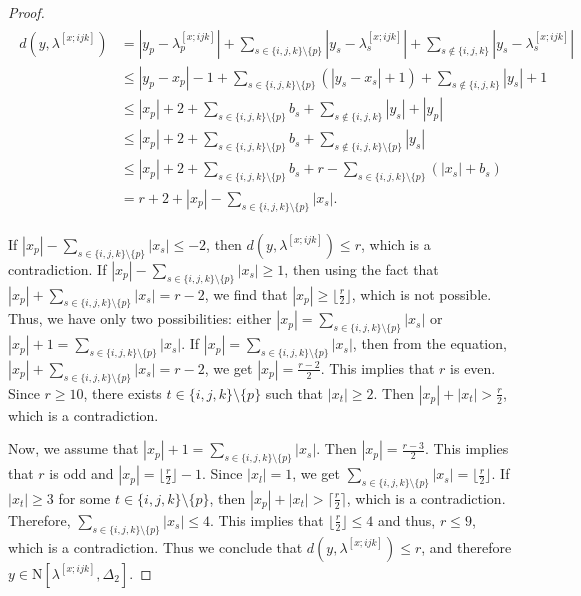\documentclass[10pt,a4paper]{amsart}
\def\n{{\mathrm{N}}}
\newcommand{\D}{\Delta}
\newcommand{\cil}{\lceil\frac{r}{2}\rceil}
\newcommand{\f}{\lfloor\frac{r}{2}\rfloor}
\begin{document}
\begin{proof}
	\begin{align*}
    \begin{split}
		d(y,\lambda^{[x;ijk]})&=|y_p-\lambda^{[x;ijk]}_p|+ \sum_{s \in \{i, j, k\}\setminus\{p\}}|y_s-\lambda^{[x;ijk]}_s|+\sum_{s\notin\{i,j,k\}}|y_s-\lambda^{[x;ijk]}_s| \\
		&\leq  |y_p-x_p|-1+ \sum_{s \in \{i, j, k\}\setminus\{p\}}(|y_s-x_s|+1 )+\sum_{s\notin\{i,j,k\}}|y_s| +1 \\
		&\leq  |x_p|+2+ \sum_{s \in \{i, j, k\}\setminus \{p\}} b_s+\sum_{s\notin\{i,j,k\}}|y_s| +|y_p| \\
		&\leq|x_p|+2+\sum_{s \in \{i, j, k\}\setminus \{p\}} b_s+\sum_{s\notin\{i, j,k\} \setminus \{p\}}|y_s| \\
		&\leq |x_p|+2 + \sum_{s \in \{i, j, k\}\setminus \{p\}} b_s+r- \sum_{s \in \{i, j, k\}\setminus \{p\}} (|x_s|+b_s) \\
		&= r+2+|x_p|-\sum_{s \in \{i, j, k\}\setminus \{p\}} |x_s|.
         	\end{split}
	\end{align*}
	
	If $|x_p|-\sum_{s \in \{i, j, k\}\setminus \{p\}} |x_s|\leq -2$, then $d(y,\lambda^{[x;ijk]})\leq r$, which is a contradiction. If $|x_p|-\sum_{s \in \{i, j, k\}\setminus \{p\}} |x_s|\geq 1$, then using the fact that $|x_p|+\sum_{s \in \{i, j, k\}\setminus \{p\}} |x_s|=r-2$, we find that $|x_p|\geq \f$, which is not possible. Thus, we have only two possibilities: either $|x_p|=\sum_{s \in \{i, j, k\}\setminus \{p\}} |x_s|$ or $|x_p|+1=\sum_{s \in \{i, j, k\}\setminus \{p\}} |x_s|$. If $|x_p|=\sum_{s \in \{i, j, k\}\setminus \{p\}} |x_s|$, then from the equation, $|x_p|+\sum_{s \in \{i, j, k\}\setminus \{p\}} |x_s|=r-2$, we get $|x_p|=\frac{r-2}{2}$. This implies that $r$ is even. Since $r\geq 10$, there exists $t\in \{i,j,k\}\setminus \{p\}$ such that $|x_t|\geq 2$. Then $|x_p|+|x_t|>\frac{r}{2}$, which is a contradiction. 
	
	Now, we assume that $|x_p|+1=\sum_{s \in \{i, j, k\}\setminus \{p\}} |x_s|$. Then $|x_p|=\frac{r-3}{2}$. This implies that $r$ is odd and $|x_p|=\f-1$. Since $|x_l|=1$, we get $\sum_{s \in \{i, j, k\}\setminus \{p\}} |x_s|=\f$. If $|x_t|\geq 3$ for some $t\in \{i, j, k\}\setminus \{p\}$, then $|x_p|+|x_t|>\cil$, which is a contradiction. Therefore,  $\sum_{s \in \{i, j, k\}\setminus \{p\}} |x_s|\leq 4$. This implies that $\f\leq 4$ and thus, $r\leq 9$, which is a contradiction. Thus we conclude that $d(y, \lambda^{[x;ijk]}) \leq r$, and therefore $y \in \n[\lambda^{[x;ijk]}, \D_2]$.
	

\end{proof}
\end{document}
